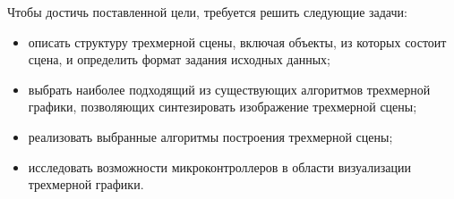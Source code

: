 Чтобы достичь поставленной цели, требуется решить следующие задачи: 
\begin{itemize}
    \item описать структуру трехмерной сцены, включая объекты, из которых состоит сцена, и определить формат задания исходных данных;
    \item выбрать наиболее подходящий из существующих алгоритмов трехмерной графики, позволяющих синтезировать изображение трехмерной сцены;
    \item реализовать выбранные алгоритмы построения трехмерной сцены;
    \item исследовать возможности микроконтроллеров в области визуализации трехмерной графики.
\end{itemize}
